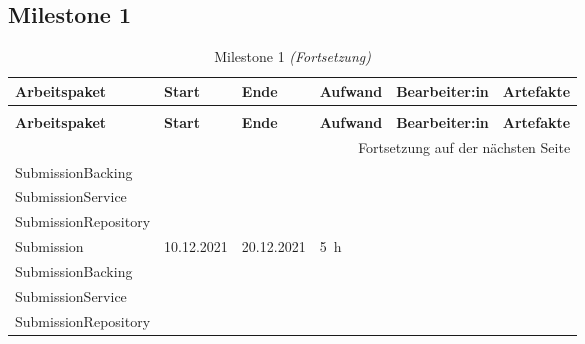 \newcommand{\atable}[3]{\begin{longtable}{llllll}
                            \caption{#2}\label{tab:#1} \\
                            \toprule
                            \textbf{Arbeitspaket} & \textbf{Start} & \textbf{Ende} & \textbf{Aufwand} & \textbf{Bearbeiter:in} & \textbf{Artefakte}
                            \\
                            \midrule
                            \endfirsthead

                            \caption{#2 \emph{(Fortsetzung)}}\\
                            \toprule
                            \textbf{Arbeitspaket} & \textbf{Start} & \textbf{Ende} & \textbf{Aufwand} & \textbf{Bearbeiter:in} & \textbf{Artefakte}
                            \\
                            \midrule
                            \endhead

                            \multicolumn{6}{r}{{Fortsetzung auf der nächsten Seite}}
                            \endfoot

                            \bottomrule
                            \endlastfoot

                            #3
\end{longtable}
}

\newcommand{\aentry}[6]{\footnotesize#1 & \footnotesize#2 & \footnotesize#3 & \footnotesize#4 & \footnotesize\makecell{#5} & \footnotesize\makecell{#6}\\\midrule}

\renewcommand{\cellalign}{cl}


\subsection{Milestone 1}
\atable{milestone1}{Milestone 1}{
    \aentry{Submission}{10.12.2021}{20.12.2021}{5~h}{Joergen Sprenger}{submission.xhtml\\SubmissionBacking\\SubmissionService\\SubmissionRepository}
    \aentry{Submission}{10.12.2021}{20.12.2021}{5~h}{Joergen Sprenger}{submission.xhtml\\SubmissionBacking\\SubmissionService\\SubmissionRepository}
}


